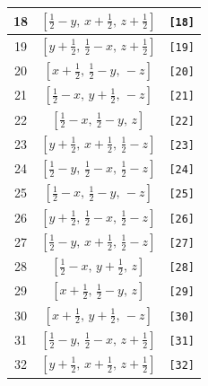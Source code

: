 \documentclass[fleqn,8pt]{jsarticle}
\begin{document}
\begin{longtable}{ccc}
18 & $\left[ \frac{1}{2} - y,\, x + \frac{1}{2},\, z + \frac{1}{2} \right]$ & {\tt [18]} \\ \hline
19 & $\left[ y + \frac{1}{2},\, \frac{1}{2} - x,\, z + \frac{1}{2} \right]$ & {\tt [19]} \\ \hline
20 & $\left[ x + \frac{1}{2},\, \frac{1}{2} - y,\, - z \right]$ & {\tt [20]} \\ \hline
21 & $\left[ \frac{1}{2} - x,\, y + \frac{1}{2},\, - z \right]$ & {\tt [21]} \\ \hline
22 & $\left[ \frac{1}{2} - x,\, \frac{1}{2} - y,\, z \right]$ & {\tt [22]} \\ \hline
23 & $\left[ y + \frac{1}{2},\, x + \frac{1}{2},\, \frac{1}{2} - z \right]$ & {\tt [23]} \\ \hline
24 & $\left[ \frac{1}{2} - y,\, \frac{1}{2} - x,\, \frac{1}{2} - z \right]$ & {\tt [24]} \\ \hline
25 & $\left[ \frac{1}{2} - x,\, \frac{1}{2} - y,\, - z \right]$ & {\tt [25]} \\ \hline
26 & $\left[ y + \frac{1}{2},\, \frac{1}{2} - x,\, \frac{1}{2} - z \right]$ & {\tt [26]} \\ \hline
27 & $\left[ \frac{1}{2} - y,\, x + \frac{1}{2},\, \frac{1}{2} - z \right]$ & {\tt [27]} \\ \hline
28 & $\left[ \frac{1}{2} - x,\, y + \frac{1}{2},\, z \right]$ & {\tt [28]} \\ \hline
29 & $\left[ x + \frac{1}{2},\, \frac{1}{2} - y,\, z \right]$ & {\tt [29]} \\ \hline
30 & $\left[ x + \frac{1}{2},\, y + \frac{1}{2},\, - z \right]$ & {\tt [30]} \\ \hline
31 & $\left[ \frac{1}{2} - y,\, \frac{1}{2} - x,\, z + \frac{1}{2} \right]$ & {\tt [31]} \\ \hline
32 & $\left[ y + \frac{1}{2},\, x + \frac{1}{2},\, z + \frac{1}{2} \right]$ & {\tt [32]} \\
\end{longtable}
\end{document}
